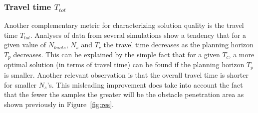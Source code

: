 \subsubsection{Travel time $T_{tot}$}
%
Another complementary metric for characterizing solution quality is the travel time
$T_{tot}$. Analyses of data from several simulations show a tendency that for a given value 
of $N_{knots}$, $N_s$ and $T_c$ the travel time decreases as the planning horizon $T_p$ decreases.
This can be explained by the simple fact that for a given $T_c$, a more optimal solution (in terms of travel time) can be found if the planning horizon $T_p$ is smaller.
%        
Another relevant observation is that the overall travel time is shorter for smaller $N_s$'s. 
This misleading improvement does take into account the fact 
that the fewer the samples the greater will be the obstacle penetration area as shown previously in Figure~\ref{fig:res}.

